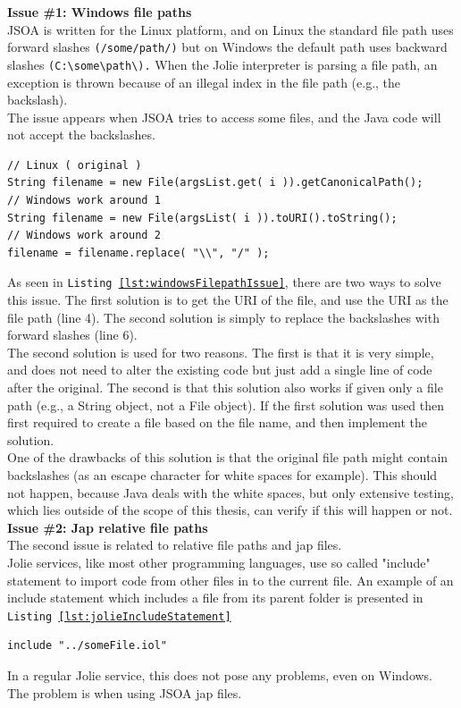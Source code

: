 \documentclass[12pt,a4paper]{article}
\begin{document}
\textbf{Issue \#1: Windows file paths} \\
JSOA is written for the Linux platform, and on Linux the standard file path uses forward slashes \verb|(/some/path/)| but on Windows the default path uses backward slashes \verb|(C:\some\path\).| When the Jolie interpreter is parsing a file path, an exception is thrown because of an illegal index in the file path (e.g., the backslash). \\

The issue appears when JSOA tries to access some files, and the Java code will not accept the backslashes.

\begin{lstlisting}[caption={Windows file path issue},label={lst:windowsFilepathIssue}]
// Linux ( original )
String filename = new File(argsList.get( i )).getCanonicalPath();
// Windows work around 1
String filename = new File(argsList( i )).toURI().toString();
// Windows work around 2
filename = filename.replace( "\\", "/" );
\end{lstlisting}

As seen in \texttt{Listing \ref{lst:windowsFilepathIssue}}, there are two ways to solve this issue. The first solution is to get the URI of the file, and use the URI as the file path (line 4). The second solution is simply to replace the backslashes with forward slashes (line 6). \\
The second solution is used for two reasons. The first is that it is very simple, and does not need to alter the existing code but just add a single line of code after the original. The second is that this solution also works if given only a file path (e.g., a String object, not a File object). If the first solution was used then first required to create a file based on the file name, and then implement the solution. \\
One of the drawbacks of this solution is that the original file path might contain backslashes (as an escape character for white spaces for example). This should not happen, because Java deals with the white spaces, but only extensive testing, which lies outside of the scope of this thesis, can verify if this will happen or not. \\

\newpage
\textbf{Issue \#2: Jap relative file paths} \\
The second issue is related to relative file paths and jap files. \\
Jolie services, like most other programming languages, use so called "include" statement to import code from other files in to the current file. An example of an include statement which includes a file from its parent folder is presented in \texttt{Listing \ref{lst:jolieIncludeStatement}}
\begin{lstlisting}[caption={Jolie include statement},label={lst:jolieIncludeStatement}]
include "../someFile.iol"
\end{lstlisting}
In a regular Jolie service, this does not pose any problems, even on Windows. The problem is when using JSOA jap files. \\
\end{document}
